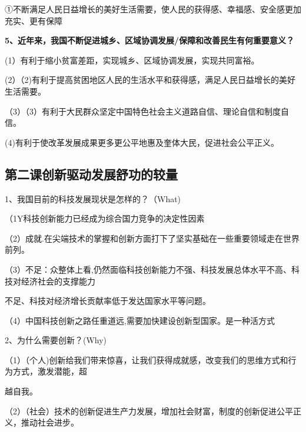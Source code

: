 \documentclass[lang=cn,11pt]{elegantbook}
\newcommand{\daofasym}[1]{{\daofasymbolfont #1}}
\newcommand{\daofasym}[1]{#1}
\begin{document}
\daofasym{①}不断满足人民日益增长的美好生活需要，使人民的获得感、幸福感、安全感更加充实、更有保障\par

\textbf{5、近年来，我国不断促进城乡、区域协调发展/保障和改善民生有何重要意义？}\par

(1）有利于缩小贫富差距，实现城乡、区域协调发展，实现共同富裕。\par

(2）（2)有利于提高贫困地区人民的生活水平和获得感，满足人民日益增长的美好生活需要。\par

（3）（3）有利于大民群众坚定中国特色社会主义道路自信、理论自信和制度自信。\par

(4)有利于使改革发展成果更多更公平地惠及奎体大民，促进社会公平正义。\par

\subsection*{第二课创新驱动发展舒功的较量}

1、我国目前的科技发展现状是怎样的？（What)\par

（1Y科技创新能力已经成为综合国力竞争的决定性因素\par

（2）成就.在尖端技术的掌握和创新方面打下了坚实基础在一些重要领域走在世界前列。\par

（3）不足：众整体上看,仍然面临科技创新能力不强、科技发展总体水平不高、科技对经济社会的支撑能力\par

不足、科技对经济增长贡献率低于发达国家水平等问题。\par

（4）中国科技创新之路任重道远,需要加快建设创新型国家。是一种活方式\par

2、为什么需要创新？(Why)\par

（1）（个人)创新给我们带来惊喜，让我们获得成就感，改变我们的思维方式和行为方式，激发潜能，超\par

越自我。\par

（2）（社会）技术的创新促进生产力发展，增加社会财富，制度的创新促进公平正义，推动社会进步。\par
\end{document}

